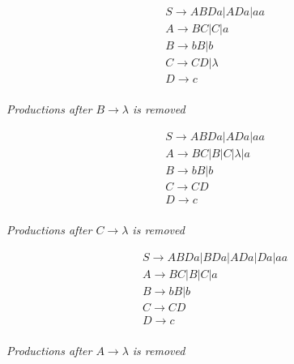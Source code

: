 \documentclass{assignment-x}
\begin{document}
\begin{multicols}{3}
    \begin{align*}
        &S \rightarrow ABDa|ADa|aa\\
        &A \rightarrow BC|C|a\\
        &B \rightarrow bB|b\\
        &C \rightarrow CD|\lambda\\
        &D \rightarrow c\\
    \end{align*}
    \begin{center}
        \textit{Productions after $B \rightarrow \lambda$ is removed}
    \end{center}
\columnbreak
    
    \begin{align*}
        &S \rightarrow ABDa|ADa|aa\\
        &A \rightarrow BC|B|C|\lambda|a\\
        &B \rightarrow bB|b\\
        &C \rightarrow CD\\
        &D \rightarrow c\\
    \end{align*}
    \begin{center}
        \textit{Productions after $C \rightarrow \lambda$ is removed}
    \end{center}
\columnbreak
    
    \begin{align*}
        &S \rightarrow ABDa|BDa|ADa|Da|aa\\
        &A \rightarrow BC|B|C|a\\
        &B \rightarrow bB|b\\
        &C \rightarrow CD\\
        &D \rightarrow c\\
    \end{align*}
    \begin{center}
        \textit{Productions after $A \rightarrow \lambda$ is removed}
    \end{center}
\end{multicols}
\end{document}

